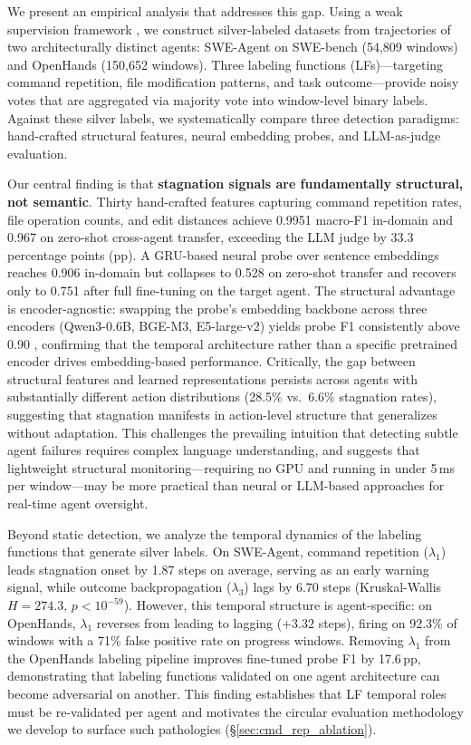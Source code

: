 We present an empirical analysis that addresses this gap.
Using a weak supervision framework \citep{ratner2016dataprogramming,ratner2017snorkel}, we construct silver-labeled datasets from trajectories of two architecturally distinct agents: SWE-Agent \citep{yang2024sweagent} on SWE-bench \citep{jimenez2024swebench} (54,809 windows) and OpenHands \citep{wang2025openhands} (150,652 windows).
Three labeling functions (LFs)---targeting command repetition, file modification patterns, and task outcome---provide noisy votes that are aggregated via majority vote into window-level binary labels.
Against these silver labels, we systematically compare three detection paradigms: hand-crafted structural features, neural embedding probes, and LLM-as-judge evaluation.

Our central finding is that \textbf{stagnation signals are fundamentally structural, not semantic}.
Thirty hand-crafted features capturing command repetition rates, file operation counts, and edit distances achieve 0.9951 macro-F1 in-domain and 0.967 on zero-shot cross-agent transfer, exceeding the LLM judge by 33.3 percentage points (pp).
A GRU-based neural probe \citep{cho2014gru} over sentence embeddings reaches 0.906 in-domain but collapses to 0.528 on zero-shot transfer and recovers only to 0.751 after full fine-tuning on the target agent.
The structural advantage is encoder-agnostic: swapping the probe's embedding backbone across three encoders (Qwen3-0.6B, BGE-M3, E5-large-v2) yields probe F1 consistently above 0.90 \citep{zhang2025qwen3embedding,chen2024bgem3,wang2024e5}, confirming that the temporal architecture rather than a specific pretrained encoder drives embedding-based performance.
Critically, the gap between structural features and learned representations persists across agents with substantially different action distributions (28.5\% vs.\ 6.6\% stagnation rates), suggesting that stagnation manifests in action-level structure that generalizes without adaptation.
This challenges the prevailing intuition that detecting subtle agent failures requires complex language understanding, and suggests that lightweight structural monitoring---requiring no GPU and running in under 5\,ms per window---may be more practical than neural or LLM-based approaches for real-time agent oversight.

Beyond static detection, we analyze the temporal dynamics of the labeling functions that generate silver labels.
On SWE-Agent, command repetition ($\lambda_1$) leads stagnation onset by 1.87 steps on average, serving as an early warning signal, while outcome backpropagation ($\lambda_3$) lags by 6.70 steps (Kruskal-Wallis $H{=}274.3$, $p{<}10^{-59}$).
However, this temporal structure is agent-specific: on OpenHands, $\lambda_1$ reverses from leading to lagging ($+3.32$ steps), firing on 92.3\% of windows with a 71\% false positive rate on progress windows.
Removing $\lambda_1$ from the OpenHands labeling pipeline improves fine-tuned probe F1 by 17.6\,pp, demonstrating that labeling functions validated on one agent architecture can become adversarial on another.
This finding establishes that LF temporal roles must be re-validated per agent and motivates the circular evaluation methodology we develop to surface such pathologies (\S\ref{sec:cmd_rep_ablation}).

